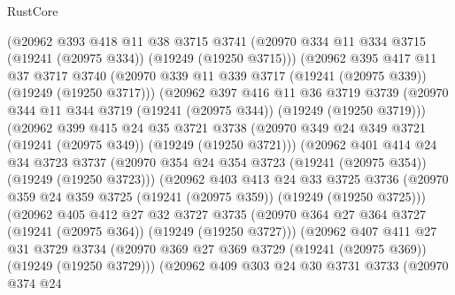 \begin{lexlean}{RustCore}
\begin{coremodule}
          (@20962
            @393
            @418
            @11
            @38
            @3715
            @3741
            (@20970 @334 @11 @334 @3715 (@19241 (@20975 @334)) (@19249 (@19250 @3715)))
            (@20962
              @395
              @417
              @11
              @37
              @3717
              @3740
              (@20970 @339 @11 @339 @3717 (@19241 (@20975 @339)) (@19249 (@19250 @3717)))
              (@20962
                @397
                @416
                @11
                @36
                @3719
                @3739
                (@20970 @344 @11 @344 @3719 (@19241 (@20975 @344)) (@19249 (@19250 @3719)))
                (@20962
                  @399
                  @415
                  @24
                  @35
                  @3721
                  @3738
                  (@20970 @349 @24 @349 @3721 (@19241 (@20975 @349)) (@19249 (@19250 @3721)))
                  (@20962
                    @401
                    @414
                    @24
                    @34
                    @3723
                    @3737
                    (@20970 @354 @24 @354 @3723 (@19241 (@20975 @354)) (@19249 (@19250 @3723)))
                    (@20962
                      @403
                      @413
                      @24
                      @33
                      @3725
                      @3736
                      (@20970 @359 @24 @359 @3725 (@19241 (@20975 @359)) (@19249 (@19250 @3725)))
                      (@20962
                        @405
                        @412
                        @27
                        @32
                        @3727
                        @3735
                        (@20970 @364 @27 @364 @3727 (@19241 (@20975 @364)) (@19249 (@19250 @3727)))
                        (@20962
                          @407
                          @411
                          @27
                          @31
                          @3729
                          @3734
                          (@20970
                            @369
                            @27
                            @369
                            @3729
                            (@19241 (@20975 @369))
                            (@19249 (@19250 @3729)))
                          (@20962
                            @409
                            @303
                            @24
                            @30
                            @3731
                            @3733
                            (@20970
                              @374
                              @24

\end{coremodule}
\end{lexlean}
